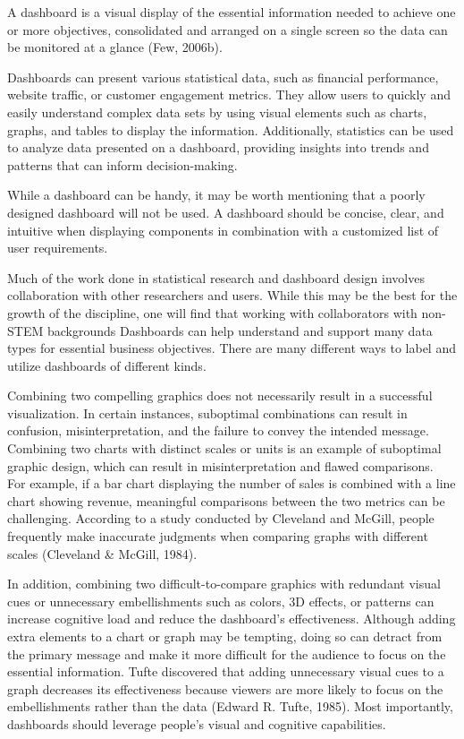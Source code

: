 \documentclass[print]{nuthesis}
\begin{document}
A dashboard is a visual display of the essential information needed to achieve one or more objectives, consolidated and arranged on a single screen so the data can be monitored at a glance (Few, 2006b).

Dashboards can present various statistical data, such as financial performance, website traffic, or customer engagement metrics.
They allow users to quickly and easily understand complex data sets by using visual elements such as charts, graphs, and tables to display the information.
Additionally, statistics can be used to analyze data presented on a dashboard, providing insights into trends and patterns that can inform decision-making.

While a dashboard can be handy, it may be worth mentioning that a poorly designed dashboard will not be used.
A dashboard should be concise, clear, and intuitive when displaying components in combination with a customized list of user requirements.

Much of the work done in statistical research and dashboard design involves collaboration with other researchers and users.
While this may be the best for the growth of the discipline, one will find that working with collaborators with non-STEM backgrounds Dashboards can help understand and support many data types for essential business objectives.
There are many different ways to label and utilize dashboards of different kinds.

Combining two compelling graphics does not necessarily result in a successful visualization.
In certain instances, suboptimal combinations can result in confusion, misinterpretation, and the failure to convey the intended message. Combining two charts with distinct scales or units is an example of suboptimal graphic design, which can result in misinterpretation and flawed comparisons.\\
For example, if a bar chart displaying the number of sales is combined with a line chart showing revenue, meaningful comparisons between the two metrics can be challenging.
According to a study conducted by Cleveland and McGill, people frequently make inaccurate judgments when comparing graphs with different scales (Cleveland \& McGill, 1984).

In addition, combining two difficult-to-compare graphics with redundant visual cues or unnecessary embellishments such as colors, 3D effects, or patterns can increase cognitive load and reduce the dashboard's effectiveness.
Although adding extra elements to a chart or graph may be tempting, doing so can detract from the primary message and make it more difficult for the audience to focus on the essential information.
Tufte discovered that adding unnecessary visual cues to a graph decreases its effectiveness because viewers are more likely to focus on the embellishments rather than the data (Edward R. Tufte, 1985).
Most importantly, dashboards should leverage people's visual and cognitive capabilities.
\end{document}

